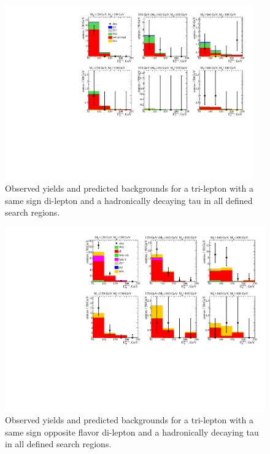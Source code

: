\begin{figure}[htp]
\begin{center}
\includegraphics[width=0.95\textwidth]{plots/ossf0tau1.pdf}
\caption{Observed yields and predicted backgrounds for a tri-lepton with a same sign di-lepton and a hadronically decaying tau in all defined search regions.}
\label{fig:SStau1}
\end{center}
\end{figure}
\begin{figure}[htp]
\begin{center}
\includegraphics[width=1.0\textwidth]{plots/ossf0tau1_C2.pdf}
\caption{Observed yields and predicted backgrounds for a tri-lepton with a same sign opposite flavor di-lepton and a hadronically decaying tau in all defined search regions.}
\label{fig:SSOFtau1}
\end{center}
\end{figure}
